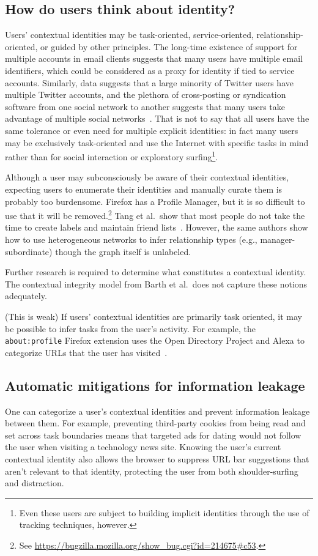 \documentclass[10pt, conference, compsocconf]{IEEEtran}
\begin{document}
\subsection{How do users think about identity?}
Users' contextual identities may be task-oriented, service-oriented,
relationship-oriented, or guided by other principles. The long-time existence
of support for multiple accounts in email clients suggests that many users have
multiple email identifiers, which could be considered as a proxy for identity
if tied to service accounts. Similarly, data suggests that a large minority of
Twitter users have multiple Twitter accounts, and the plethora of cross-posting
or syndication software from one social network to another suggests that many
users take advantage of multiple social networks~\cite{twitter,xpost}.  That is
not to say that all users have the same tolerance or even need for multiple
explicit identities: in fact many users may be exclusively task-oriented and
use the Internet with specific tasks in mind rather than for social interaction
or exploratory surfing\footnote{Even these users are subject to building
implicit identities through the use of tracking techniques, however.}.

Although a user may subconsciously be aware of their contextual identities,
expecting users to enumerate their identities and manually curate them is
probably too burdensome. Firefox has a Profile Manager, but it is so difficult
to use that it will be removed.\footnote{See
\url{https://bugzilla.mozilla.org/show\_bug.cgi?id=214675\#c53}.} Tang et
al.~show that most people do not take the time to create labels and maintain
friend lists~\cite{tang}. However, the same authors show how to use
heterogeneous networks to infer relationship types (e.g., manager-subordinate)
though the graph itself is unlabeled.

Further research is required to determine what constitutes a contextual
identity. The contextual integrity model from Barth et al.~does not capture
these notions adequately.

(This is weak)
If users' contextual identities are primarily task oriented, it may be
possible to infer tasks from the user's activity. For example, the
\texttt{about:profile} Firefox extension uses the Open Directory Project and
Alexa to categorize URLs that the user has visited~\cite{aboutprofile}.

\subsection{Automatic mitigations for information leakage}
One can categorize a user's contextual identities and prevent information
leakage between them.  For example, preventing third-party cookies from being
read and set across task boundaries means that targeted ads for dating would
not follow the user when visiting a technology news site. Knowing the user's
current contextual identity also allows the browser to suppress URL bar
suggestions that aren't relevant to that identity, protecting the user from
both shoulder-surfing and distraction.
\end{document}
